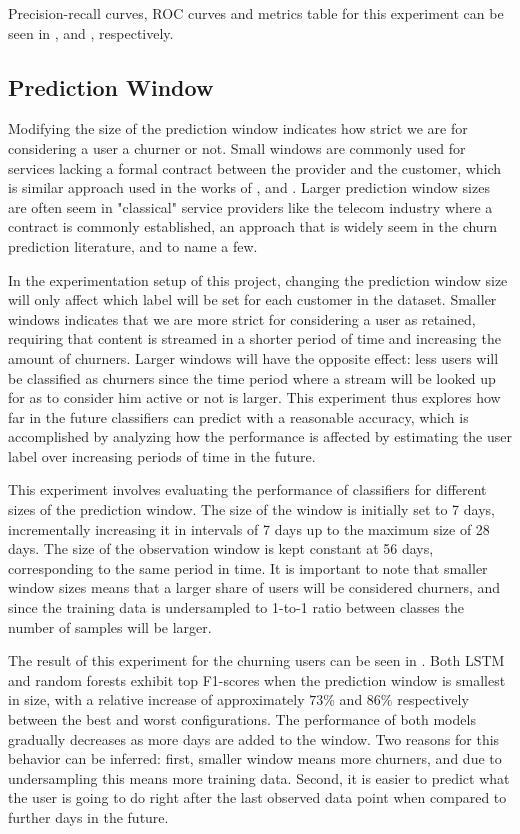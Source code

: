 \documentclass{kththesis}
\begin{document}
Precision-recall curves, ROC curves and metrics table for this experiment can be seen in ,  and , respectively.

\subsection{Prediction Window}

Modifying the size of the prediction window indicates how strict we are for considering a user a churner or not. Small windows are commonly used for services lacking a formal contract between the provider and the customer, which is similar approach used in the works of \citep{Dror2012}, \citep{Runge2014} and \citep{Pudipeddi2014}. Larger prediction window sizes are often seem in "classical" service providers like the telecom industry where a contract is commonly established, an approach that is widely seem in the churn prediction literature, \citep{Khan2015} and \citep{Hassouna2015} to name a few. 

In the experimentation setup of this project, changing the prediction window size will only affect which label will be set for each customer in the dataset. Smaller windows indicates that we are more strict for considering a user as retained, requiring that content is streamed in a shorter period of time and increasing the amount of churners. Larger windows will have the opposite effect: less users will be classified as churners since the time period where a stream will be looked up for as to consider him active or not is larger. This experiment thus explores how far in the future classifiers can predict with a reasonable accuracy, which is accomplished by analyzing how the performance is affected by estimating the user label over increasing periods of time in the future. 

This experiment involves evaluating the performance of classifiers for different sizes of the prediction window. The size of the window is initially set to 7 days, incrementally increasing it in intervals of 7 days up to the maximum size of 28 days. The size of the observation window is kept constant at 56 days, corresponding to the same period in time. It is important to note that smaller window sizes means that a larger share of users will be considered churners, and since the training data is undersampled to 1-to-1 ratio between classes the number of samples will be larger. 

The result of this experiment for the churning users can be seen in . Both LSTM and random forests exhibit top F1-scores when the prediction window is smallest in size, with a relative increase of approximately $73\%$ and $86\%$ respectively between the best and worst configurations. The  performance of both models gradually decreases as more days are added to the window. Two reasons for this behavior can be inferred: first, smaller window means more churners, and due to undersampling this means more training data. Second, it is easier to predict what the user is going to do right after the last observed data point when compared to further days in the future. 
\end{document}
